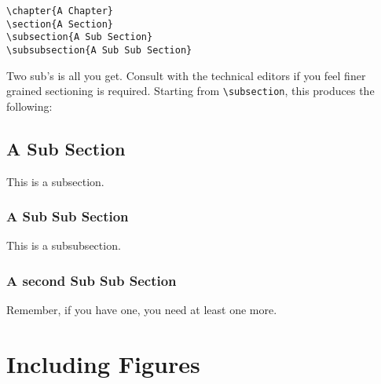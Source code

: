 \begin{verbatim}
\chapter{A Chapter}
\section{A Section}
\subsection{A Sub Section}
\subsubsection{A Sub Sub Section}
\end{verbatim}

Two sub's is all you get.  
Consult with the technical editors if you feel finer grained
sectioning is required.
Starting from \verb|\subsection|, this produces the following:

\subsection{A Sub Section}
\label{sec:sub}

This is a subsection.

\subsubsection{A Sub Sub Section}
\label{sec:subsub}

This is a subsubsection.

\subsubsection{A second Sub Sub Section}
\label{sec:subsub2}

Remember, if you have one, you need at least one more.



\section{Including Figures}
\label{sec:figures}

